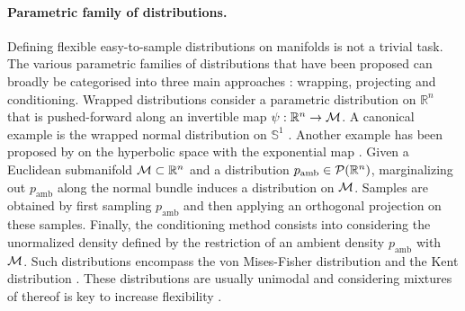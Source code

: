\paragraph{Parametric family of distributions.} Defining flexible easy-to-sample
distributions on manifolds is not a trivial task.
The various parametric families of distributions that have been proposed can broadly be categorised into three main approaches \citep{navarro2017multivariate}: wrapping, projecting and conditioning.
Wrapped distributions consider a parametric distribution on $\mathbb{R}^n$ that is pushed-forward along an invertible map $\psi: \mathbb{R}^n \rightarrow \mathcal M$.
A canonical example is the wrapped normal distribution on $\mathbb{S}^1$
\citep{collett1981Discriminating}.  Another example has been proposed by
\cite{mathieu2019continuous,nagano2019wrapped} on the hyperbolic space with the
exponential map .  Given a Euclidean submanifold $\mathcal M \subset \mathbb{R}^n$ and a
distribution $p_{\text{amb}} \in \mathcal{P}(\mathbb{R}^n)$,
marginalizing out $p_{\text{amb}}$ along the normal bundle induces a distribution on $\mathcal M$.
Samples are obtained by first sampling $p_{\text{amb}}$ and then applying an orthogonal projection on these samples.
Finally, the conditioning method consists into considering the unormalized density defined by the restriction of an ambient density $p_{\text{amb}}$ with $\mathcal M$.
Such distributions encompass the von Mises-Fisher
distribution \citep{fisher1953dispersion} and the Kent distribution
\citep{kent1982fisher}.
These distributions are usually unimodal and 
considering mixtures of thereof is key to increase flexibility
\citep{peel2001fitting,mardia2008multivariate}.

